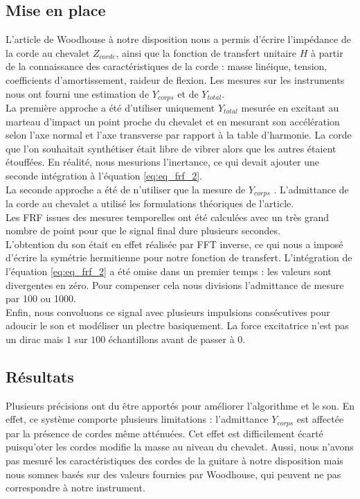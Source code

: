 \documentclass[a4paper,10pt]{article}
\begin{document}
\subsection{Mise en place}

L'article de Woodhouse à notre disposition nous a permis d'écrire l'impédance
de la corde au chevalet $Z_{corde}$, ainsi que la fonction de transfert
unitaire $H$ à partir de la connaissance des caractéristiques de la corde :
masse linéique, tension, coefficients d'amortissement, raideur de flexion. Les
mesures sur les instruments nous ont fourni une estimation de $Y_{corps}$ et de
$Y_{total}$. \\

La première approche a été d'utiliser uniquement $Y_{total}$ mesurée en
excitant au marteau d'impact un point proche du chevalet et en mesurant son
accélération selon l'axe normal et l'axe transverse par rapport à la table
d'harmonie. La corde que l'on souhaitait synthétiser était libre de vibrer
alors que les autres étaient étouffées. En réalité, nous mesurions l'inertance,
ce qui devait ajouter une seconde intégration à l'équation \ref{eq:eq_frf_2}.\\

La seconde approche a été de n'utiliser que la mesure de $Y_{corps}$ .
L'admittance de la corde au chevalet a utilisé les formulations théoriques de
l'article. \\

Les FRF issues des mesures temporelles ont été calculées avec un très grand
nombre de point pour que le signal final dure plusieurs secondes.\\

L'obtention du son était en effet réalisée par FFT inverse, ce qui nous a
imposé d'écrire la symétrie hermitienne pour notre fonction de transfert.
L'intégration de l'équation \ref{eq:eq_frf_2} a été omise dans un premier temps
: les valeurs sont divergentes en zéro. Pour compenser cela nous divisions
l'admittance de mesure par 100 ou 1000.\\

Enfin, nous convoluons ce signal avec plusieurs impulsions consécutives pour
adoucir le son et modéliser un plectre basiquement. La force excitatrice n'est
pas un dirac mais $1$ sur $100$ échantillons avant de passer à 0.

\subsection{Résultats}
%
Plusieurs précisions ont du être apportés pour améliorer l'algorithme et le
son. En effet, ce système comporte plusieurs limitations : l'admittance
$Y_{corps}$ est affectée par la présence de cordes même atténuées. Cet effet
est difficilement écarté puisqu'oter les cordes modifie la masse au niveau du
chevalet. Aussi, nous n'avons pas mesuré les caractéristiques des cordes de la
guitare à notre disposition mais nous somnes basés sur des valeurs fournies par
Woodhouse, qui peuvent ne pas correspondre à notre instrument.  \\
\end{document}
